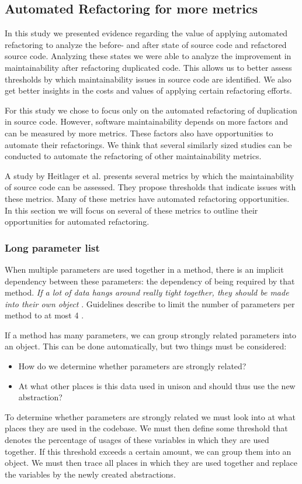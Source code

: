 \subsection{Automated Refactoring for more metrics}
In this study we presented evidence regarding the value of applying automated refactoring to analyze the before- and after state of source code and refactored source code. Analyzing these states we were able to analyze the improvement in maintainability after refactoring duplicated code. This allows us to better assess thresholds by which maintainability issues in source code are identified. We also get better insights in the costs and values of applying certain refactoring efforts.

For this study we chose to focus only on the automated refactoring of duplication in source code. However, software maintainability depends on more factors and can be measured by more metrics. These factors also have opportunities to automate their refactorings. We think that several similarly sized studies can be conducted to automate the refactoring of other maintainability metrics.

A study by Heitlager et al. \cite{heitlager2007practical} presents several metrics by which the maintainability of source code can be assessed. They propose thresholds that indicate issues with these metrics. Many of these metrics have automated refactoring opportunities. In this section we will focus on several of these metrics to outline their opportunities for automated refactoring.

\subsubsection{Long parameter list}
When multiple parameters are used together in a method, there is an implicit dependency between these parameters: the dependency of being required by that method. \textit{If a lot of data hangs around really tight together, they should be made into their own object} \cite{fowler1999refactoring}. Guidelines describe to limit the number of parameters per method to at most 4 \cite{visser2016building}.

If a method has many parameters, we can group strongly related parameters into an object. This can be done automatically, but two things must be considered:
\begin{itemize}
  \item How do we determine whether parameters are strongly related?
  \item At what other places is this data used in unison and should thus use the new abstraction?
\end{itemize}
To determine whether parameters are strongly related we must look into at what places they are used in the codebase. We must then define some threshold that denotes the percentage of usages of these variables in which they are used together. If this threshold exceeds a certain amount, we can group them into an object. We must then trace all places in which they are used together and replace the variables by the newly created abstractions.

